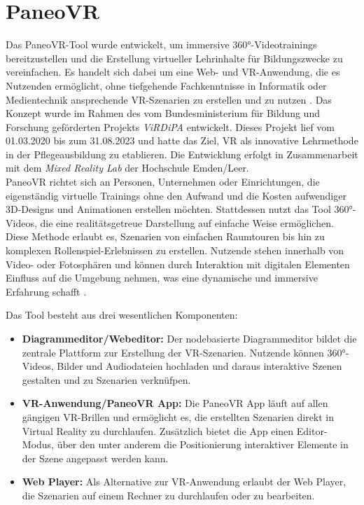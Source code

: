 \section{PaneoVR}

Das PaneoVR-Tool wurde entwickelt, um immersive 360°-Videotrainings bereitzustellen und die Erstellung virtueller Lehrinhalte für Bildungszwecke zu vereinfachen. Es handelt sich dabei um eine Web- und VR-Anwendung, die es Nutzenden ermöglicht, ohne tiefgehende Fachkenntnisse in Informatik oder Medientechnik ansprechende VR-Szenarien zu erstellen und zu nutzen \citep{paneovr-startseite}. Das Konzept wurde im Rahmen des vom Bundesministerium für Bildung und Forschung geförderten Projekts \textit{ViRDiPA} \citep{virdipa} entwickelt. Dieses Projekt lief vom 01.03.2020 bis zum 31.08.2023 und hatte das Ziel, VR als innovative Lehrmethode in der Pflegeausbildung zu etablieren. Die Entwicklung erfolgt in Zusammenarbeit mit dem \textit{Mixed Reality Lab} der Hochschule Emden/Leer.\\
PaneoVR richtet sich an Personen, Unternehmen oder Einrichtungen, die eigenständig virtuelle Trainings ohne den Aufwand und die Kosten aufwendiger 3D-Designs und Animationen erstellen möchten. Stattdessen nutzt das Tool 360°-Videos, die eine realitätsgetreue Darstellung auf einfache Weise ermöglichen. Diese Methode erlaubt es, Szenarien von einfachen Raumtouren bis hin zu komplexen Rollenspiel-Erlebnissen zu erstellen. Nutzende stehen innerhalb von Video- oder Fotosphären und können durch Interaktion mit digitalen Elementen Einfluss auf die Umgebung nehmen, was eine dynamische und immersive Erfahrung schafft \citep{paneovr-startseite}.

Das Tool besteht aus drei wesentlichen Komponenten:

\begin{itemize}
    \item \textbf{Diagrammeditor/Webeditor:}
    Der nodebasierte Diagrammeditor bildet die zentrale Plattform zur Erstellung der VR-Szenarien. Nutzende können 360°-Videos, Bilder und Audiodateien hochladen und daraus interaktive Szenen gestalten und zu Szenarien verknüfpen. 
    \item \textbf{VR-Anwendung/PaneoVR App:}
    Die PaneoVR App läuft auf allen gängigen VR-Brillen und ermöglicht es, die erstellten Szenarien direkt in Virtual Reality zu durchlaufen. Zusätzlich bietet die App einen Editor-Modus, über den unter anderem die Positionierung interaktiver Elemente in der Szene angepasst werden kann. 
    \item \textbf{Web Player:}
    Als Alternative zur VR-Anwendung erlaubt der Web Player, die Szenarien auf einem Rechner zu durchlaufen oder zu bearbeiten.
\end{itemize}

